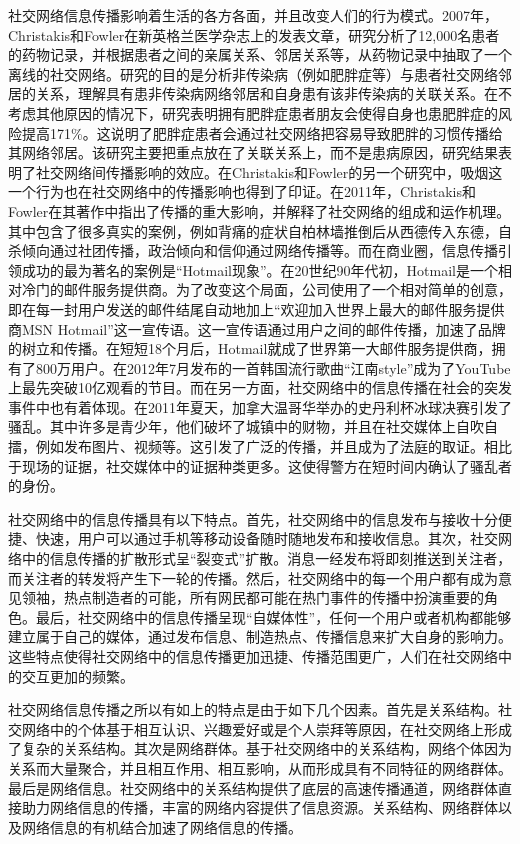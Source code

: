 社交网络信息传播影响着生活的各方各面，并且改变人们的行为模式。2007年，Christakis和Fowler在新英格兰医学杂志上的发表文章，研究分析了12,000名患者的药物记录，并根据患者之间的亲属关系、邻居关系等，从药物记录中抽取了一个离线的社交网络。研究的目的是分析非传染病（例如肥胖症等）与患者社交网络邻居的关系，理解具有患非传染病网络邻居和自身患有该非传染病的关联关系。在不考虑其他原因的情况下，研究表明拥有肥胖症患者朋友会使得自身也患肥胖症的风险提高171\%。这说明了肥胖症患者会通过社交网络把容易导致肥胖的习惯传播给其网络邻居。该研究主要把重点放在了关联关系上，而不是患病原因，研究结果表明了社交网络间传播影响的效应。在Christakis和Fowler的另一个研究中，吸烟这一个行为也在社交网络中的传播影响也得到了印证。在2011年，Christakis和Fowler在其著作中指出了传播的重大影响，并解释了社交网络的组成和运作机理。其中包含了很多真实的案例，例如背痛的症状自柏林墙推倒后从西德传入东德，自杀倾向通过社团传播，政治倾向和信仰通过网络传播等。而在商业圈，信息传播引领成功的最为著名的案例是“Hotmail现象”。在20世纪90年代初，Hotmail是一个相对冷门的邮件服务提供商。为了改变这个局面，公司使用了一个相对简单的创意，即在每一封用户发送的邮件结尾自动地加上“欢迎加入世界上最大的邮件服务提供商MSN Hotmail”这一宣传语。这一宣传语通过用户之间的邮件传播，加速了品牌的树立和传播。在短短18个月后，Hotmail就成了世界第一大邮件服务提供商，拥有了800万用户。在2012年7月发布的一首韩国流行歌曲“江南style”成为了YouTube上最先突破10亿观看的节目。而在另一方面，社交网络中的信息传播在社会的突发事件中也有着体现。在2011年夏天，加拿大温哥华举办的史丹利杯冰球决赛引发了骚乱。其中许多是青少年，他们破坏了城镇中的财物，并且在社交媒体上自吹自擂，例如发布图片、视频等。这引发了广泛的传播，并且成为了法庭的取证。相比于现场的证据，社交媒体中的证据种类更多。这使得警方在短时间内确认了骚乱者的身份。

社交网络中的信息传播具有以下特点。首先，社交网络中的信息发布与接收十分便捷、快速，用户可以通过手机等移动设备随时随地发布和接收信息。其次，社交网络中的信息传播的扩散形式呈“裂变式”扩散。消息一经发布将即刻推送到关注者，而关注者的转发将产生下一轮的传播。然后，社交网络中的每一个用户都有成为意见领袖，热点制造者的可能，所有网民都可能在热门事件的传播中扮演重要的角色。最后，社交网络中的信息传播呈现“自媒体性”，任何一个用户或者机构都能够建立属于自己的媒体，通过发布信息、制造热点、传播信息来扩大自身的影响力。这些特点使得社交网络中的信息传播更加迅捷、传播范围更广，人们在社交网络中的交互更加的频繁。

社交网络信息传播之所以有如上的特点是由于如下几个因素。首先是关系结构。社交网络中的个体基于相互认识、兴趣爱好或是个人崇拜等原因，在社交网络上形成了复杂的关系结构。其次是网络群体。基于社交网络中的关系结构，网络个体因为关系而大量聚合，并且相互作用、相互影响，从而形成具有不同特征的网络群体。最后是网络信息。社交网络中的关系结构提供了底层的高速传播通道，网络群体直接助力网络信息的传播，丰富的网络内容提供了信息资源。关系结构、网络群体以及网络信息的有机结合加速了网络信息的传播。

